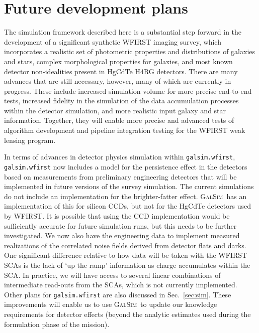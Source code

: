 \documentclass[usenatbib]{mnras}
\newcommand{\galsim}{\textsc{GalSim}}
\begin{document}
\section{Future development plans}\label{sec:future}

The simulation framework described here is a substantial step forward in the development of a significant synthetic WFIRST imaging survey, which incorporates a realistic set of photometric properties and distributions of galaxies and stars, complex morphological properties for galaxies, and most known detector non-idealities present in HgCdTe H4RG detectors. 
There are many advances that are still necessary, however, many of which are currently in progress. 
These include increased simulation volume for more precise end-to-end tests, increased fidelity in the simulation of the data accumulation processes within the detector simulation, and more realistic input galaxy and star information. 
Together, they will enable more precise and advanced tests of algorithm development and pipeline integration testing for the WFIRST weak lensing program.

In terms of advances in detector physics simulation within \texttt{galsim.wfirst}, \texttt{galsim.wfirst} now includes a model for the persistence effect in the detectors based on measurements from preliminary engineering detectors that will be implemented in future versions of the survey simulation. 
The current simulations do not include an implementation for the brighter-fatter effect. \galsim\ has an implementation of this for silicon CCDs, but not for the HgCdTe detectors used by WFIRST.  
It is possible that using the CCD implementation would be sufficiently accurate for future simulation runs, but this needs to be further investigated. 
We now also have the engineering data to implement measured realizations of the correlated noise fields derived from detector flats and darks. 
One significant difference relative to how data will be taken with the WFIRST SCAs is the lack of `up the ramp' information as charge accumulates within the SCA. 
In practice, we will have access to several linear combinations of intermediate read-outs from the SCAs, which is not currently implemented. 
Other plans for \texttt{galsim.wfirst} are also discussed in Sec.~\ref{sec:sim}. These improvements will enable us to use \galsim\ to update our knowledge requirements for detector effects (beyond the analytic estimates used during the formulation phase of the mission).  
\end{document}
